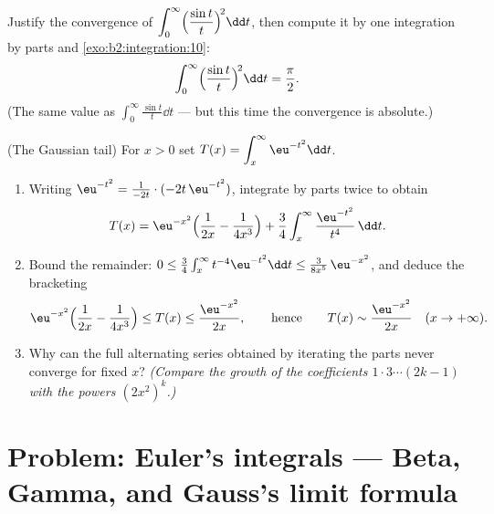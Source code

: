 \begin{exercise}[$\star\star$]\label{exo:b2:integration:11}
Justify the convergence of $\displaystyle\int_0^\infty
\Bigl(\frac{\sin t}{t}\Bigr)^{\!2}\dd t$, then compute it by one
integration by parts and \cref{exo:b2:integration:10}:
\[
\int_0^\infty \Bigl(\frac{\sin t}{t}\Bigr)^{\!2}\dd t
= \frac{\pi}{2} .
\]
(The same value as $\int_0^\infty \frac{\sin t}{t}\dd t$ --- but
this time the convergence is absolute.)
\end{exercise}

\begin{exercise}[$\star\star\star$]\label{exo:b2:integration:12}
(The Gaussian tail) For $x > 0$ set $T(x) = \displaystyle
\int_x^\infty \eu^{-t^2}\dd t$.
\begin{enumerate}
  \item Writing $\eu^{-t^2} = \frac{1}{-2t}\cdot(-2t\,\eu^{-t^2})$,
        integrate by parts twice to obtain
        \[
        T(x) = \eu^{-x^2}\Bigl(\frac{1}{2x} -
        \frac{1}{4x^3}\Bigr) +
        \frac34\int_x^\infty \frac{\eu^{-t^2}}{t^4}\,\dd t .
        \]
  \item Bound the remainder: $0 \leq \frac34\int_x^\infty
        t^{-4}\eu^{-t^2}\dd t \leq \frac{3}{8x^5}\,\eu^{-x^2}$,
        and deduce the bracketing
        \[
        \eu^{-x^2}\Bigl(\frac{1}{2x} - \frac{1}{4x^3}\Bigr)
        \leq T(x) \leq \frac{\eu^{-x^2}}{2x},
        \qquad\text{hence}\qquad
        T(x) \sim \frac{\eu^{-x^2}}{2x} \quad (x \to +\infty).
        \]
  \item Why can the full alternating series obtained by iterating
        the parts never converge for fixed $x$? \emph{(Compare the
        growth of the coefficients $1\cdot3\cdots(2k-1)$ with the
        powers $(2x^2)^k$.)}
\end{enumerate}
\end{exercise}

\section{Problem: Euler's integrals --- Beta, Gamma, and Gauss's
limit formula}

